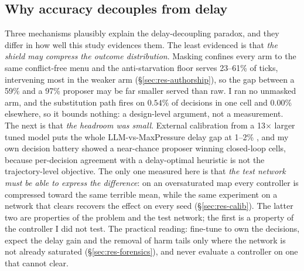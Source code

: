 \subsection{Why accuracy decouples from delay}\label{sec:dis-decoupling}
Three mechanisms plausibly explain the delay-decoupling paradox, and they
differ in how well this study evidences them. The least evidenced is that
\emph{the shield may compress the outcome distribution}. Masking confines
every arm to the same conflict-free menu and the anti-starvation floor
serves 23--61\% of ticks, intervening most in the weaker arm
(\S\ref{sec:res-authorship}), so the gap between a 59\% and a 97\%
proposer may be far smaller served than raw. I ran no unmasked arm, and
the substitution path fires on $0.54\%$ of decisions in one cell and
$0.00\%$ elsewhere, so it bounds nothing: a design-level argument, not a
measurement. The next is that \emph{the headroom was small}. External
calibration from a 13$\times$ larger tuned model puts the whole
LLM-vs-MaxPressure delay gap at 1--2\% \cite{dglight2026}, and my own
decision battery showed a near-chance proposer winning closed-loop cells,
because per-decision agreement with a delay-optimal heuristic is not the
trajectory-level objective. The only one measured here is that \emph{the
test network must be able to express the difference}: on an oversaturated
map every controller is compressed toward the same terrible mean, while
the same experiment on a network that clears recovers the effect on every
seed (\S\ref{sec:res-calib}). The latter two are properties of the problem
and the test network; the first is a property of the controller I did not
test. The practical reading: fine-tune to own the decisions, expect the
delay gain and the removal of harm tails only where the network is not
already saturated (\S\ref{sec:res-forensics}), and never evaluate a
controller on one that cannot clear.
